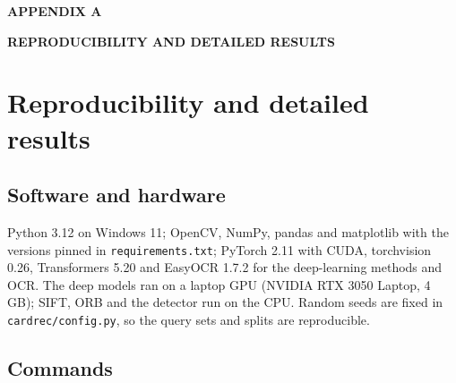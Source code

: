 
\begin{center}
\vspace*{60pt}

{\fontsize{18pt}{0pt} \MakeUppercase{\textbf{%
    Appendix A
    }}}
\vspace*{24pt}

{\fontsize{18pt}{0pt} \MakeUppercase{\textbf{%
    Reproducibility and detailed results
    }}}

\vspace*{100pt}
\end{center}
\thispagestyle{empty}
\appendix
{}
%


\chapter{Reproducibility and detailed results}
\label{app:repro}

\section{Software and hardware}

Python 3.12 on Windows 11; OpenCV, NumPy, pandas and matplotlib with the versions pinned in \texttt{requirements.txt}; PyTorch 2.11 with CUDA, torchvision 0.26, Transformers 5.20 and EasyOCR 1.7.2 for the deep-learning methods and OCR. The deep models ran on a laptop GPU (NVIDIA RTX 3050 Laptop, 4\,GB); SIFT, ORB and the detector run on the CPU. Random seeds are fixed in \texttt{cardrec/config.py}, so the query sets and splits are reproducible.

\section{Commands}

